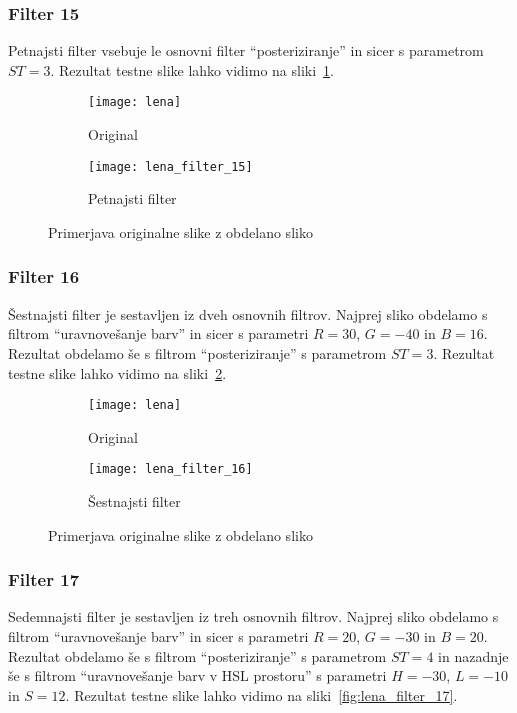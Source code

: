 \subsubsection*{Filter 15}
Petnajsti filter vsebuje le osnovni filter ``posteriziranje'' in sicer s parametrom
$ST = 3$. Rezultat testne slike lahko vidimo na sliki~\ref{fig:lena_filter_15}.

\begin{figure}[!ht]
    \centering
    \begin{subfigure}[b]{0.4\textwidth}
        \texttt{[image: lena]}
        \caption{Original}
    \end{subfigure}
    \begin{subfigure}[b]{0.4\textwidth}
        \texttt{[image: lena\_filter\_15]}
        \caption{Petnajsti filter}
    \end{subfigure}
    \caption{Primerjava originalne slike z obdelano sliko}
    \label{fig:lena_filter_15}
\end{figure}


\subsubsection*{Filter 16}
Šestnajsti filter je sestavljen iz dveh osnovnih filtrov. Najprej sliko obdelamo s
filtrom ``uravnovešanje barv'' in sicer s parametri $R = 30$, $G = -40$ in
$B = 16$. Rezultat obdelamo še s filtrom ``posteriziranje'' s parametrom
$ST =3$. Rezultat testne slike lahko vidimo na sliki~\ref{fig:lena_filter_16}.

\begin{figure}[!ht]
    \centering
    \begin{subfigure}[b]{0.4\textwidth}
        \texttt{[image: lena]}
        \caption{Original}
    \end{subfigure}
    \begin{subfigure}[b]{0.4\textwidth}
        \texttt{[image: lena\_filter\_16]}
        \caption{Šestnajsti filter}
    \end{subfigure}
    \caption{Primerjava originalne slike z obdelano sliko}
    \label{fig:lena_filter_16}
\end{figure}


\subsubsection*{Filter 17}
Sedemnajsti filter je sestavljen iz treh osnovnih filtrov. Najprej sliko obdelamo s
filtrom ``uravnovešanje barv'' in sicer s parametri $R = 20$, $G = -30$ in
$B = 20$. Rezultat obdelamo še s filtrom ``posteriziranje'' s parametrom
$ST= 4$ in nazadnje še s filtrom ``uravnovešanje barv v HSL prostoru'' s
parametri $H = -30$, $L = -10$ in $S = 12$. Rezultat testne slike lahko
vidimo na sliki~\ref{fig:lena_filter_17}.

